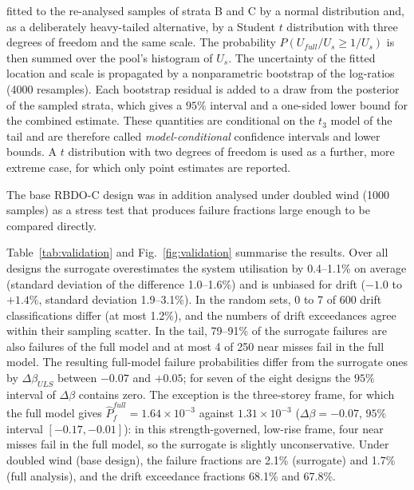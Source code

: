 \begin{itemize}
fitted to the re-analysed samples of strata B and C by a normal distribution and, as a deliberately
heavy-tailed alternative, by a Student $t$ distribution with three degrees of freedom and the same
scale. The probability $P(U_{full}/U_s\ge1/U_s)$ is then summed over the pool's histogram of $U_s$.
The uncertainty of the fitted location and scale is propagated by a nonparametric bootstrap of the
log-ratios (4000 resamples). Each bootstrap residual is added to a draw from the posterior of the
sampled strata, which gives a $95\%$ interval and a one-sided lower bound for the combined estimate.
These quantities are conditional on the $t_3$ model of the tail and are therefore called
\emph{model-conditional} confidence intervals and lower bounds. A $t$ distribution with two
degrees of freedom is used as a further, more extreme case, for which only point estimates are
reported.
\end{itemize}
The base RBDO-C design was in addition analysed under doubled wind (1000 samples) as a stress test
that produces failure fractions large enough to be compared directly.

Table~\ref{tab:validation} and Fig.~\ref{fig:validation} summarise the results. Over all designs
the surrogate overestimates the system utilisation by 0.4--1.1\% on average (standard deviation of
the difference 1.0--1.6\%) and is unbiased for drift ($-1.0$ to $+1.4\%$, standard deviation
1.9--3.1\%). In the random sets, 0 to 7 of 600 drift classifications differ (at most 1.2\%), and
the numbers of drift exceedances agree within their sampling scatter. In the tail, 79--91\% of the
surrogate failures are also failures of the full model and at most 4 of 250 near misses fail in
the full model. The resulting full-model failure probabilities differ from the surrogate ones by
$\Delta\beta_{ULS}$ between $-0.07$ and $+0.05$; for seven of the eight designs the $95\%$ interval of
$\Delta\beta$ contains zero. The exception is the three-storey frame, for which the full model gives
$\hat P_f^{full}=1.64\times10^{-3}$ against $1.31\times10^{-3}$ ($\Delta\beta=-0.07$, $95\%$
interval $[-0.17,-0.01]$): in this strength-governed, low-rise frame, four near misses fail in the
full model, so the surrogate is slightly unconservative. Under doubled wind (base design), the
failure fractions are 2.1\% (surrogate) and 1.7\% (full analysis), and the drift exceedance
fractions 68.1\% and 67.8\%.

